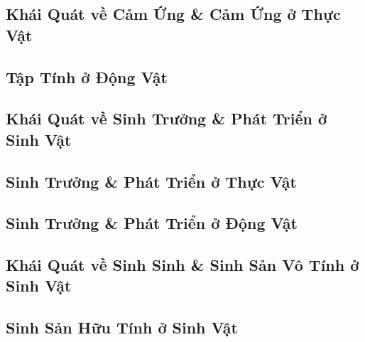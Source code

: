 \documentclass{article}
\numberwithin{equation}{section}
\begin{document}

\subsection{Khái Quát về Cảm Ứng \& Cảm Ứng ở Thực Vật}


\subsection{Tập Tính ở Động Vật}


\subsection{Khái Quát về Sinh Trưởng \& Phát Triển ở Sinh Vật}


\subsection{Sinh Trưởng \& Phát Triển ở Thực Vật}


\subsection{Sinh Trưởng \& Phát Triển ở Động Vật}


\subsection{Khái Quát về Sinh Sinh \& Sinh Sản Vô Tính ở Sinh Vật}


\subsection{Sinh Sản Hữu Tính ở Sinh Vật}
\end{document}
